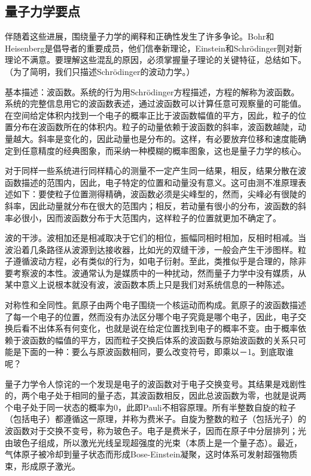 \documentclass[13pt,a4paper]{article}
\begin{document}
\begin{CJK}{UTF8}{song}
\subsection{量子力学要点}
伴随着这些进展，围绕量子力学的阐释和正确性发生了许多争论。Bohr和Heisenberg是倡导者的重要成员，他们信奉新理论，Einstein和Schrödinger则对新理论不满意。要理解这些混乱的原因，必须掌握量子理论的关键特征，总结如下。（为了简明，我们只描述Schrödinger的波动力学。）

基本描述：波函数。系统的行为用Schrödinger方程描述，方程的解称为波函数。系统的完整信息用它的波函数表述，通过波函数可以计算任意可观察量的可能值。在空间给定体积内找到一个电子的概率正比于波函数幅值的平方，因此，粒子的位置分布在波函数所在的体积内。粒子的动量依赖于波函数的斜率，波函数越陡，动量越大。斜率是变化的，因此动量也是分布的。这样，有必要放弃位移和速度能确定到任意精度的经典图象，而采纳一种模糊的概率图象，这也是量子力学的核心。

对于同样一些系统进行同样精心的测量不一定产生同一结果，相反，结果分散在波函数描述的范围内，因此，电子特定的位置和动量没有意义。这可由测不准原理表述如下：要使粒子位置测得精确，波函数必须是尖峰型的，然而，尖峰必有很陡的斜率，因此动量就分布在很大的范围内；相反，若动量有很小的分布，波函数的斜率必很小，因而波函数分布于大范围内，这样粒子的位置就更加不确定了。

波的干涉。波相加还是相减取决于它们的相位，振幅同相时相加，反相时相减。当波沿着几条路径从波源到达接收器，比如光的双缝干涉，一般会产生干涉图样。粒子遵循波动方程，必有类似的行为，如电子衍射。至此，类推似乎是合理的，除非要考察波的本性。波通常认为是媒质中的一种扰动，然而量子力学中没有媒质，从某中意义上说根本就没有波，波函数本质上只是我们对系统信息的一种陈述。

对称性和全同性。氦原子由两个电子围绕一个核运动而构成。氦原子的波函数描述了每一个电子的位置，然而没有办法区分哪个电子究竟是哪个电子，因此，电子交换后看不出体系有何变化，也就是说在给定位置找到电子的概率不变。由于概率依赖于波函数的幅值的平方，因而粒子交换后体系的波函数与原始波函数的关系只可能是下面的一种：要么与原波函数相同，要么改变符号，即乘以－1。到底取谁呢？

量子力学令人惊诧的一个发现是电子的波函数对于电子交换变号。其结果是戏剧性的，两个电子处于相同的量子态，其波函数相反，因此总波函数为零，也就是说两个电子处于同一状态的概率为0，此即Pauli不相容原理。所有半整数自旋的粒子（包括电子）都遵循这一原理，并称为费米子。自旋为整数的粒子（包括光子）的波函数对于交换不变号，称为玻色子。电子是费米子，因而在原子中分层排列；光由玻色子组成，所以激光光线呈现超强度的光束（本质上是一个量子态）。最近，气体原子被冷却到量子状态而形成Bose-Einstein凝聚，这时体系可发射超强物质束，形成原子激光。


\end{CJK}
\end{document}
